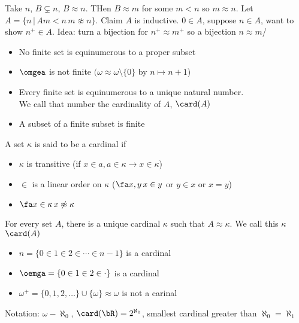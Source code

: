 \begin{pf}
    Take $n$, $B \subsetneq n$, $B \approx n$. THen $B \approx m$ for some $m < n$ so $m \approx n$. Let $A = \{n \, | \, A m < n \, m \not\approx n\}$. Claim $A$ is inductive. $0 \in A$, suppose $n \in A$, want to show $n^+ \in A$. Idea: turn a bijection for $n^+ \approx m^+$ so a bijection $n \approx m$/
\end{pf}

\begin{corollary}
    \begin{itemize}
        \item No finite set is equinumerous to a proper subset 
        \item $\omgea$ is not finite $(\omega \approx \omega \setminus \{0\}$ by $n \mapsto n+1$)
        \item Every finite set is equinumerous to a unique natural number. \\
        We call that number the cardinality of $A$, $\card(A)$
        \item A subset of a finite subset is finite
    \end{itemize}
\end{corollary}

\begin{definition}
    A set $\kappa$ is said to be a cardinal if 
    \begin{itemize}
        \item $\kappa$ is transitive (if $x \in a, a \in \kappa \to x \in \kappa$)
        \item $\in$ is a linear order on $\kappa$ ($\fa x, y \, x \in y$ or $y \in x$ or $x=y$) 
        \item $\fa x \in \kappa \, x \not\approx \kappa$
    \end{itemize}
\end{definition}

\begin{theorem}
    For every set $A$, there is a unique cardinal $\kappa$ such that $A \approx \kappa$. We call this $\kappa$ $\card(A)$
\end{theorem}

\begin{example}
    \begin{itemize}
        \item $n = \{0 \in 1 \in 2 \in \cdots \in n-1\}$ is a cardinal 
        \item $\oemga = \{0 \in 1 \in 2 \in \cdot \}$ is a cardinal 
        \item $\omega^+ = \{0, 1, 2, \ldots\} \cup \{\omega\} \approx \omega$ is not a carinal
    \end{itemize}
\end{example}

\noindent
Notation: $\omega - \aleph_0$, $\card(\bR) = 2^{\aleph_0}$, smallest cardinal greater than $\aleph_0 = \aleph_1$ 